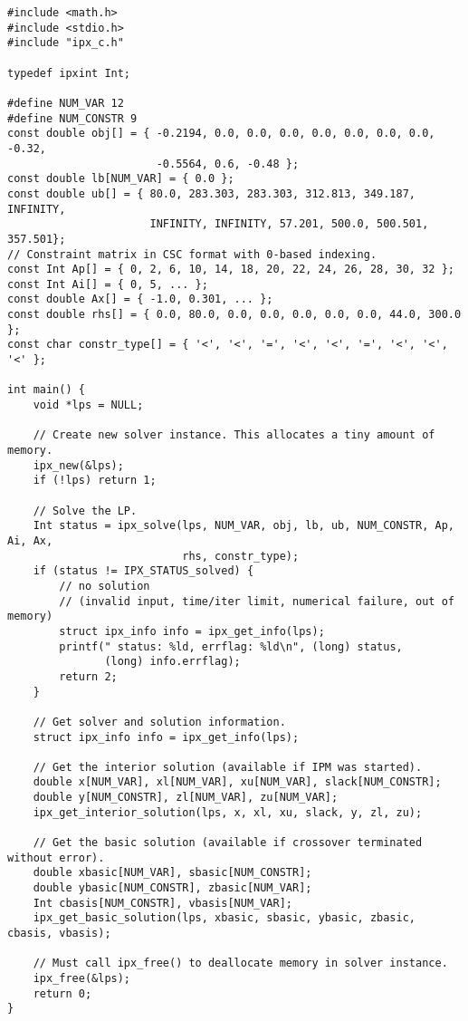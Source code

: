 \documentclass{article}
\begin{document}
\begin{verbatim}
#include <math.h>
#include <stdio.h>
#include "ipx_c.h"

typedef ipxint Int;

#define NUM_VAR 12
#define NUM_CONSTR 9
const double obj[] = { -0.2194, 0.0, 0.0, 0.0, 0.0, 0.0, 0.0, 0.0, -0.32,
                       -0.5564, 0.6, -0.48 };
const double lb[NUM_VAR] = { 0.0 };
const double ub[] = { 80.0, 283.303, 283.303, 312.813, 349.187, INFINITY,
                      INFINITY, INFINITY, 57.201, 500.0, 500.501, 357.501};
// Constraint matrix in CSC format with 0-based indexing.
const Int Ap[] = { 0, 2, 6, 10, 14, 18, 20, 22, 24, 26, 28, 30, 32 };
const Int Ai[] = { 0, 5, ... };
const double Ax[] = { -1.0, 0.301, ... };
const double rhs[] = { 0.0, 80.0, 0.0, 0.0, 0.0, 0.0, 0.0, 44.0, 300.0 };
const char constr_type[] = { '<', '<', '=', '<', '<', '=', '<', '<', '<' };

int main() {
    void *lps = NULL;

    // Create new solver instance. This allocates a tiny amount of memory.
    ipx_new(&lps);
    if (!lps) return 1;

    // Solve the LP.
    Int status = ipx_solve(lps, NUM_VAR, obj, lb, ub, NUM_CONSTR, Ap, Ai, Ax,
                           rhs, constr_type);
    if (status != IPX_STATUS_solved) {
        // no solution
        // (invalid input, time/iter limit, numerical failure, out of memory)
        struct ipx_info info = ipx_get_info(lps);
        printf(" status: %ld, errflag: %ld\n", (long) status,
               (long) info.errflag);
        return 2;
    }

    // Get solver and solution information.
    struct ipx_info info = ipx_get_info(lps);

    // Get the interior solution (available if IPM was started).
    double x[NUM_VAR], xl[NUM_VAR], xu[NUM_VAR], slack[NUM_CONSTR];
    double y[NUM_CONSTR], zl[NUM_VAR], zu[NUM_VAR];
    ipx_get_interior_solution(lps, x, xl, xu, slack, y, zl, zu);

    // Get the basic solution (available if crossover terminated without error).
    double xbasic[NUM_VAR], sbasic[NUM_CONSTR];
    double ybasic[NUM_CONSTR], zbasic[NUM_VAR];
    Int cbasis[NUM_CONSTR], vbasis[NUM_VAR];
    ipx_get_basic_solution(lps, xbasic, sbasic, ybasic, zbasic, cbasis, vbasis);

    // Must call ipx_free() to deallocate memory in solver instance.
    ipx_free(&lps);
    return 0;
}
\end{verbatim}
\end{document}
